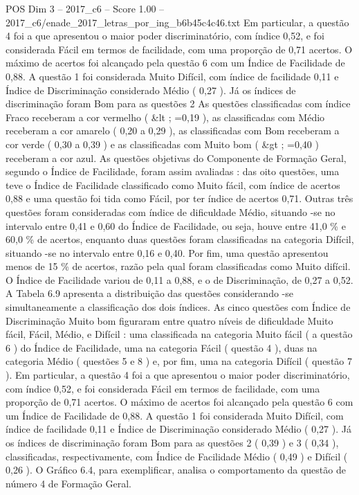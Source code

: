 \begin{textsample}{POS Dim 3 – 2017\_c6 – Score 1.00 – 2017\_c6/enade\_2017\_letras\_por\_ing\_b6b45c4c46.txt}
Em particular, a questão 4 foi a que apresentou o maior poder discriminatório, com índice 0,52, e foi considerada Fácil em termos de facilidade, com uma proporção de 0,71 acertos.
O máximo de acertos foi alcançado pela questão 6 com um Índice de Facilidade de 0,88.
A questão 1 foi considerada Muito Difícil, com índice de facilidade 0,11 e Índice de Discriminação considerado Médio ( 0,27 ).
Já os índices de discriminação foram Bom para as questões 2 As questões classificadas com índice Fraco receberam a cor vermelho ( \&lt ; =0,19 ), as classificadas com Médio receberam a cor amarelo ( 0,20 a 0,29 ), as classificadas com Bom receberam a cor verde ( 0,30 a 0,39 ) e as classificadas com Muito bom ( \&gt ; =0,40 ) receberam a cor azul.
As questões objetivas do Componente de Formação Geral, segundo o Índice de Facilidade, foram assim avaliadas : das oito questões, uma teve o Índice de Facilidade classificado como Muito fácil, com índice de acertos 0,88 e uma questão foi tida como Fácil, por ter índice de acertos 0,71.
Outras três questões foram consideradas com índice de dificuldade Médio, situando -se no intervalo entre 0,41 e 0,60 do Índice de Facilidade, ou seja, houve entre 41,0 \% e 60,0 \% de acertos, enquanto duas questões foram classificadas na categoria Difícil, situando -se no intervalo entre 0,16 e 0,40.
Por fim, uma questão apresentou menos de 15 \% de acertos, razão pela qual foram classificadas como Muito difícil.
O Índice de Facilidade variou de 0,11 a 0,88, e o de Discriminação, de 0,27 a 0,52.
A Tabela 6.9 apresenta a distribuição das questões considerando -se simultaneamente a classificação dos dois índices.
As cinco questões com Índice de Discriminação Muito bom figuraram entre quatro níveis de dificuldade Muito fácil, Fácil, Médio, e Difícil : uma classificada na categoria Muito fácil ( a questão 6 ) do Índice de Facilidade, uma na categoria Fácil ( questão 4 ), duas na categoria Médio ( questões 5 e 8 ) e, por fim, uma na categoria Difícil ( questão 7 ).
Em particular, a questão 4 foi a que apresentou o maior poder discriminatório, com índice 0,52, e foi considerada Fácil em termos de facilidade, com uma proporção de 0,71 acertos.
O máximo de acertos foi alcançado pela questão 6 com um Índice de Facilidade de 0,88.
A questão 1 foi considerada Muito Difícil, com índice de facilidade 0,11 e Índice de Discriminação considerado Médio ( 0,27 ).
Já os índices de discriminação foram Bom para as questões 2 ( 0,39 ) e 3 ( 0,34 ), classificadas, respectivamente, com Índice de Facilidade Médio ( 0,49 ) e Difícil ( 0,26 ).
O Gráfico 6.4, para exemplificar, analisa o comportamento da questão de número 4 de Formação Geral.

\end{textsample}
